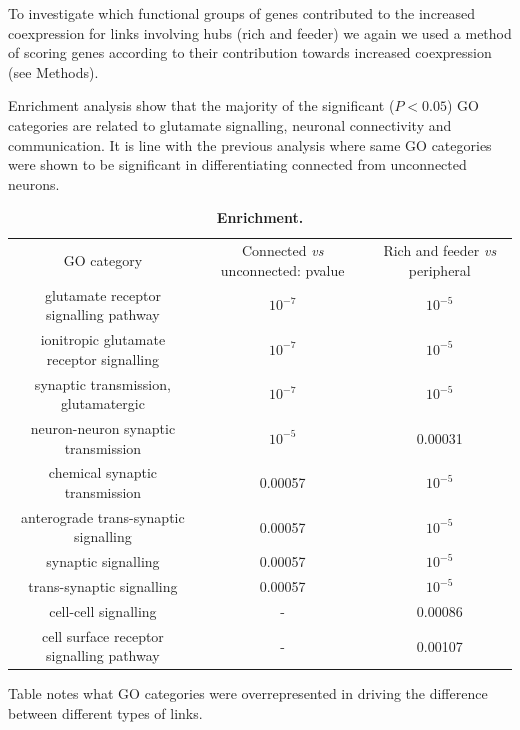 \documentclass[10pt,letterpaper]{article}
\newlength\savedwidth
\newcommand\thickhline{\noalign{\global\savedwidth\arrayrulewidth\global\arrayrulewidth 2pt}%
\hline
\noalign{\global\arrayrulewidth\savedwidth}}
\begin{document}
To investigate which functional groups of genes contributed to the increased coexpression for links involving hubs (rich and feeder) we again we used a method of scoring genes according to their contribution towards increased coexpression (see Methods).

Enrichment analysis show that the majority of the significant ($P < 0.05$) GO categories are related to glutamate signalling, neuronal connectivity and communication.
It is line with the previous analysis where same GO categories were shown to be significant in differentiating connected from unconnected neurons.
\begin{table}[!ht]
\begin{adjustwidth}{-2.25in}{0in} %
\centering
\caption{
{\bf Enrichment.}}
\begin{tabular}{ |c|c|c| }
\thickhline

GO category  		& Connected \textit{vs} unconnected: pvalue  	& Rich and feeder \textit{vs} peripheral      \\ \thickhline
glutamate receptor signalling pathway      	& $10^{-7}$      		&  $10^{-5}$\\ \hline
ionitropic glutamate receptor signalling     & $10^{-7}$      		&  $10^{-5}$ \\ \hline
synaptic transmission, glutamatergic      	& $10^{-7}$     			&  $10^{-5}$ \\ \hline
neuron-neuron synaptic transmission          & $10^{-5}$     			&  0.00031\\ \hline
chemical synaptic transmission               & 0.00057      			&  $10^{-5}$\\ \hline
anterograde trans-synaptic signalling      	& 0.00057      			&  $10^{-5}$\\ \hline
synaptic signalling                          & 0.00057      			&  $10^{-5}$\\ \hline
trans-synaptic signalling                    & 0.00057      			&  $10^{-5}$ \\ \hline
cell-cell signalling                         &      -           		&  0.00086 \\ \hline
cell surface receptor signalling pathway     &       -          		&  0.00107 \\ \hline

\end{tabular}
\begin{flushleft} Table notes what GO categories were overrepresented in driving the difference between different types of links.
\end{flushleft}
\label{table1}
\end{adjustwidth}
\end{table}
\end{document}
